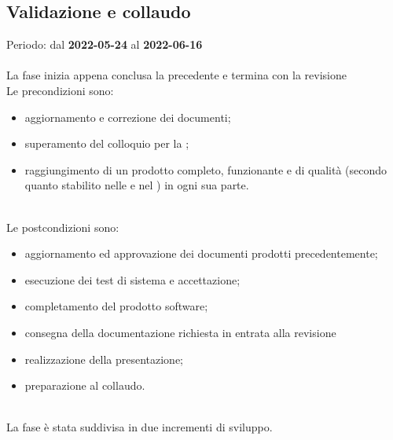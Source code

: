 \subsection{Validazione e collaudo}
Periodo: dal \textbf{2022-05-24} al \textbf{2022-06-16} \mbox{} \\ \mbox{} \\
La fase inizia appena conclusa la precedente e termina con la revisione \CA{} \\
Le precondizioni sono:
\begin{itemize}
 	\item aggiornamento e correzione dei documenti;
 	\item superamento del colloquio per la \PB{};
  	\item raggiungimento di un prodotto completo, funzionante e di qualità (secondo quanto stabilito nelle \NdP{} e nel \PdQ{} ) in ogni sua parte.
\end{itemize} \mbox{} \\
Le postcondizioni sono:
\begin{itemize}
	\item aggiornamento ed approvazione dei documenti prodotti precedentemente;
	\item esecuzione dei test di sistema e accettazione;
	\item completamento del prodotto software;
 	\item consegna della documentazione richiesta in entrata alla revisione \CA{}
	\item realizzazione della presentazione;
 	\item preparazione al collaudo.  
\end{itemize} \mbox{} \\
La fase è stata suddivisa in due incrementi di sviluppo.
\pagebreak

